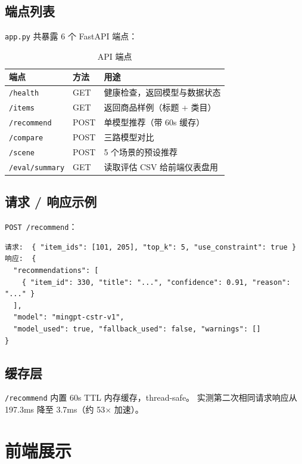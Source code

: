 \documentclass[12pt,a4paper]{article}
\begin{document}
\subsection{端点列表}
\texttt{app.py} 共暴露 6 个 FastAPI 端点：

\begin{table}[ht]
    \centering
    \begin{tabular}{lll}
        \toprule
        \textbf{端点} & \textbf{方法} & \textbf{用途} \\
        \midrule
        \texttt{/health}        & GET  & 健康检查，返回模型与数据状态 \\
        \texttt{/items}         & GET  & 返回商品样例（标题 + 类目） \\
        \texttt{/recommend}     & POST & 单模型推荐（带 60s 缓存） \\
        \texttt{/compare}       & POST & 三路模型对比 \\
        \texttt{/scene}         & POST & 5 个场景的预设推荐 \\
        \texttt{/eval/summary}  & GET  & 读取评估 CSV 给前端仪表盘用 \\
        \bottomrule
    \end{tabular}
    \caption{API 端点}
\end{table}

\subsection{请求 / 响应示例}
\texttt{POST /recommend}：
\begin{verbatim}
请求:  { "item_ids": [101, 205], "top_k": 5, "use_constraint": true }
响应:  {
  "recommendations": [
    { "item_id": 330, "title": "...", "confidence": 0.91, "reason": "..." }
  ],
  "model": "mingpt-cstr-v1",
  "model_used": true, "fallback_used": false, "warnings": []
}
\end{verbatim}

\subsection{缓存层}
\texttt{/recommend} 内置 60s TTL 内存缓存，thread-safe。
实测第二次相同请求响应从 197.3ms 降至 3.7ms（约 53$\times$ 加速）。

\section{前端展示}
\end{document}
